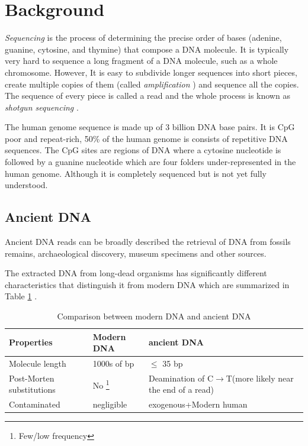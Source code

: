 \documentclass[11pt,a4paper]{report}
\begin{document}


\clearpage
\section{Background } \label{Background }


\emph{Sequencing} is the process of determining the precise order of bases 
(adenine, guanine, cytosine, and thymine) that compose a DNA molecule. 
It is typically very hard to sequence a long fragment of a DNA molecule, 
such as a whole chromosome. However, It is easy to subdivide longer sequences
into short pieces, create multiple copies of them (called \emph{amplification} ) 
and sequence all the copies. The sequence of every piece is called a read and 
the whole process is known as \emph{shotgun sequencing} \cite{algorithmDesign}.


The human genome sequence is made up of 3 billion DNA base pairs.
It is CpG poor and repeat-rich, 50\% of the human genome is consists 
of repetitive DNA sequences. The CpG sites are regions of DNA where 
a cytosine nucleotide is followed by a guanine nucleotide which are 
four folders under-represented in the human genome. Although it is 
completely sequenced but is not yet fully understood. 




\subsection{Ancient DNA } \label{Ancient DNA }

Ancient DNA reads can be broadly described the retrieval of DNA from fossils 
remains, archaeological discovery, museum specimens and other sources.

The extracted DNA from long-dead organisms has significantly different 
characteristics that distinguish it from modern DNA which are summarized in 
Table \ref{aDNAchar} .\\


\begin{savenotes}
 \begin{table}[H]
  \begin{tabular}{ |  p{4cm} | p{2cm} | p{5cm} |}
    \hline
     \textbf{  Properties} & \textbf{Modern DNA } &\textbf{ ancient DNA} \\ \hline
     Molecule  length &  1000s of bp  & $\leq$  35 bp\\ \hline
     Post-Morten \hspace{35pt} substitutions & No \footnote{Few/low frequency}
     & Deamination of C$\to$T(more likely near the end of a read) \\ \hline
     Contaminated & negligible & exogenous+Modern human\\ \hline
  \end{tabular}
  \caption{Comparison between modern DNA and ancient DNA}
  \label{aDNAchar}
 \end{table}
\end{savenotes}
\end{document}
